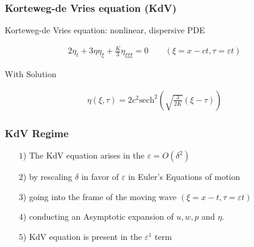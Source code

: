 \documentclass[fleqn]{beamer}
\begin{document}
    \begin{frame}
        \frametitle{Korteweg-de Vries equation (KdV)}
        Korteweg-de Vries equation: nonlinear, dispersive PDE
        \begin{ceqn}
        \begin{align}
            2\eta_t + 3 \eta \eta_\xi + \frac{K}{3} \eta_{\xi\xi\xi} =
            0\qquad \left(\xi = x-ct, \tau = \varepsilon t\right)\nonumber
        \end{align}
        \end{ceqn}
        With Solution
        \begin{ceqn}
        \begin{align}
            \eta(\xi, \tau) = 2c^2 \text{sech}^2\left( \sqrt{\frac{3}{2K}}
            \left(\xi- \tau\right)  \right)\nonumber
        \end{align}
        \end{ceqn}
    \end{frame}

    \begin{frame}
        \frametitle{KdV Regime}
        \begin{itemize}
            \item[$1$)]  The KdV equation arises in the $\varepsilon = O(\delta^2)$
            \item[$2$)] by rescaling $\delta$ in favor of $\varepsilon$ in
                Euler's Equations of motion
            \item[$3$)] going into the frame of the moving wave $(\xi = x- t, \tau = \varepsilon t)$
            \item[$4$)] conducting an Asymptotic expansion of $u , w, p$ and $\eta$.
            \item[$5$)] KdV equation is present in the $\varepsilon^1$ term
        \end{itemize}
    \end{frame}
\end{document}
